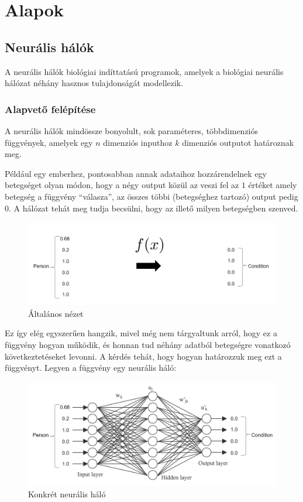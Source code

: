\documentclass[12pt]{article}
\begin{document}
\section{Alapok}


\subsection{Neurális hálók}

A neurális hálók biológiai indíttatású programok, amelyek a biológiai neurális hálózat néhány hasznos tulajdonságát modellezik.

\subsubsection{Alapvető felépítése}

A neurális hálók mindössze bonyolult, sok paraméteres, többdimenziós függvények, amelyek egy $n$ dimenziós inputhoz $k$ dimenziós outputot határoznak meg.

Például egy emberhez, pontosabban annak adataihoz hozzárendelnek egy betegséget olyan módon, hogy a négy output közül az veszi fel az $1$ értéket amely betegség a függvény “válasza”, az összes többi (betegséghez tartozó) output pedig $0$. A hálózat tehát meg tudja becsülni, hogy az illető milyen betegségben szenved.

\begin{figure}[h!]
  \includegraphics[width=\linewidth]{fgv.png}
  \caption{Általános nézet}
\end{figure}

Ez így elég egyszerűen hangzik, mivel még nem tárgyaltunk arról, hogy ez a függvény hogyan működik, és honnan tud néhány adatból betegségre vonatkozó következtetéseket levonni. A kérdés tehát, hogy hogyan határozzuk meg ezt a függvényt. Legyen a függvény egy neurális háló:

\begin{figure}[h!]
  \includegraphics[width=\linewidth]{fgv_network.png}
  \caption{Konkrét neurális háló}
\end{figure}
\end{document}
